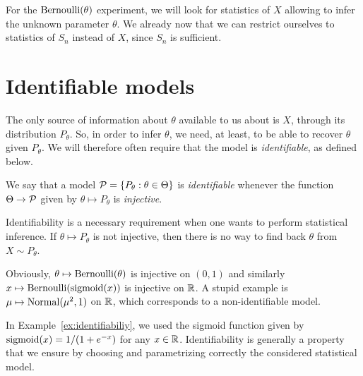 For the $\operatorname{Bernoulli}(\theta)$ experiment, we will look for statistics of $X$ allowing to infer the unknown parameter $\theta$.
We already now that we can restrict ourselves to statistics of $S_n$ instead of $X$, since $S_n$ is  sufficient.

\section{Identifiable models} %

The only source of information about $\theta$ available to us about is $X$, through its distribution $P_{\theta}$.
So, in order to infer $\theta$, we need, at least, to be able to recover $\theta$ given $P_\theta$.
We will therefore often require that the model is \emph{identifiable}, as defined below.
\begin{definition}
	\label{def:identifiable-model}
	We say that a model $\operatorname{{\mathcal P}} = \{ P_\theta : \theta \in \Theta \}$ is \emph{identifiable} whenever the function $\Theta \rightarrow \operatorname{{\mathcal P}}$ given by $\theta \mapsto P_\theta$
	is \emph{injective}.
\end{definition}
Identifiability is a necessary requirement when one wants to perform statistical inference.
If $\theta \mapsto P_\theta$ is not injective, then there is no way to find back $\theta$ from $X \sim P_\theta$.

\begin{example}
	\label{ex:identifiabiliy}
	Obviously, $\theta \mapsto \operatorname{Bernoulli}(\theta)$ is injective on $(0, 1)$ and similarly $x \mapsto \operatorname{Bernoulli}(\operatorname{sigmoid}(x))$ is injective on $\mathbb R$.
	A stupid example is $\mu \mapsto \operatorname{Normal}(\mu^2, 1)$ on $\mathbb R$, which corresponds to a non-identifiable model.
\end{example}
In Example~\ref{ex:identifiabiliy}, we used the sigmoid function given by $\operatorname{sigmoid}(x) = 1 / (1 + e^{-x})$ for any $x \in \mathbb R$.%
Identifiability is generally a property that we ensure by choosing and parametrizing correctly the considered statistical model.

